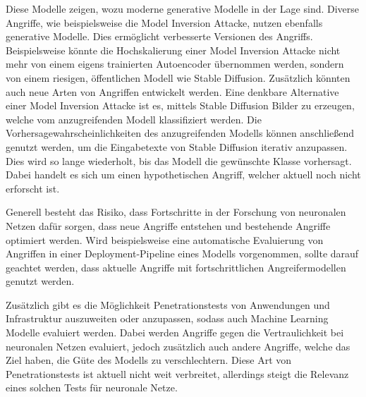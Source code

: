 Diese Modelle zeigen, wozu moderne generative Modelle in der Lage sind.
Diverse Angriffe, wie beispielsweise die Model Inversion Attacke, nutzen ebenfalls generative Modelle. 
Dies ermöglicht verbesserte Versionen des Angriffs.
Beispielsweise könnte die Hochskalierung einer Model Inversion Attacke nicht mehr von einem eigens trainierten Autoencoder übernommen werden, sondern von einem riesigen, öffentlichen Modell wie Stable Diffusion.
Zusätzlich könnten auch neue Arten von Angriffen entwickelt werden.
Eine denkbare Alternative einer Model Inversion Attacke ist es, mittels Stable Diffusion Bilder zu erzeugen, welche vom anzugreifenden Modell klassifiziert werden. 
Die Vorhersagewahrscheinlichkeiten des anzugreifenden Modells können anschließend genutzt werden, um die Eingabetexte von Stable Diffusion iterativ anzupassen.
Dies wird so lange wiederholt, bis das Modell die gewünschte Klasse vorhersagt.
Dabei handelt es sich um einen hypothetischen Angriff, welcher aktuell noch nicht erforscht ist.

Generell besteht das Risiko, dass Fortschritte in der Forschung von neuronalen Netzen dafür sorgen, dass neue Angriffe entstehen und bestehende Angriffe optimiert werden.
Wird beispielsweise eine automatische Evaluierung von Angriffen in einer Deployment-Pipeline eines Modells vorgenommen, sollte darauf geachtet werden, dass aktuelle Angriffe mit fortschrittlichen Angreifermodellen genutzt werden. 

Zusätzlich gibt es die Möglichkeit Penetrationstests von Anwendungen und Infrastruktur auszuweiten oder anzupassen, sodass auch Machine Learning Modelle evaluiert werden.
Dabei werden Angriffe gegen die Vertraulichkeit bei neuronalen Netzen evaluiert, jedoch zusätzlich auch andere Angriffe, welche \zB das Ziel haben, die Güte des Modells zu verschlechtern.
Diese Art von Penetrationstests ist aktuell nicht weit verbreitet, allerdings steigt die Relevanz eines solchen Tests für neuronale Netze.








